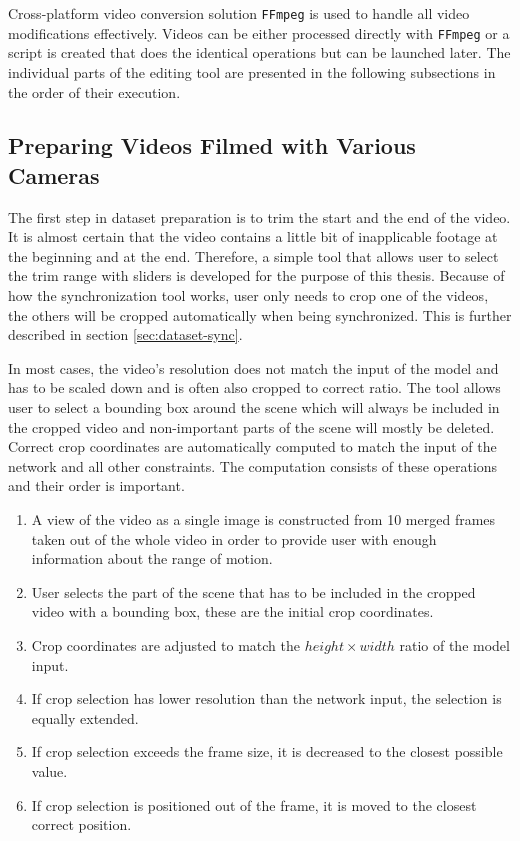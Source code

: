 Cross-platform video conversion solution \texttt{FFmpeg} is used to handle all video modifications effectively. Videos can be either processed directly with \texttt{FFmpeg} or a script is created that does the identical operations but can be launched later. The individual parts of the editing tool are presented in the following subsections in the order of their execution.

\subsection{Preparing Videos Filmed with Various Cameras}

The first step in dataset preparation is to trim the start and the end of the video. It is almost certain that the video contains a little bit of inapplicable footage at the beginning and at the end. Therefore, a simple tool that allows user to select the trim range with sliders is developed for the purpose of this thesis. Because of how the synchronization tool works, user only needs to crop one of the videos, the others will be cropped automatically when being synchronized. This is further described in section \ref{sec:dataset-sync}.

In most cases, the video's resolution does not match the input of the model and has to be scaled down and is often also cropped to correct ratio. The tool allows user to select a bounding box around the scene which will always be included in the cropped video and non-important parts of the scene will mostly be deleted. Correct crop coordinates are automatically computed to match the input of the network and all other constraints. The computation consists of these operations and their order is important.

\begin{enumerate}
    \item A view of the video as a single image is constructed from 10 merged frames taken out of the whole video in order to provide user with enough information about the range of motion.
    \item User selects the part of the scene that has to be included in the cropped video with a bounding box, these are the initial crop coordinates.
    \item Crop coordinates are adjusted to match the $height \times width$ ratio of the model input.
    \item If crop selection has lower resolution than the network input, the selection is equally extended.
    \item If crop selection exceeds the frame size, it is decreased to the closest possible value.
    \item If crop selection is positioned out of the frame, it is moved to the closest correct position.
\end{enumerate}

